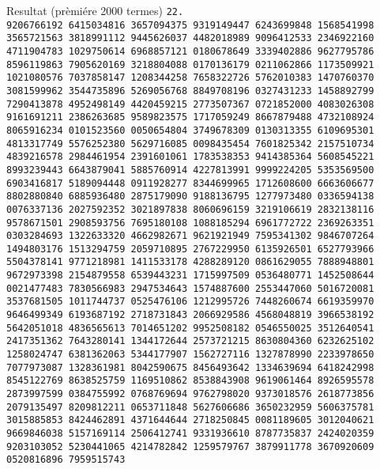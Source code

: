 \documentclass{beamer}
\begin{document}
\begin{frame}{Resultat (pr\`emi\'ere 2000 termes)}
\noindent\tiny{\texttt{22.\\
9206766192 6415034816 3657094375 9319149447 6243699848 1568541998 3565721563
3818991112 9445626037 4482018989 9096412533 2346922160 4711904783 1029750614
6968857121 0180678649 3339402886 9627795786 8596119863 7905620169 3218804088
0170136179 0211062866 1173509921 1021080576 7037858147 1208344258 7658322726
5762010383 1470760370 3081599962 3544735896 5269056768 8849708196 0327431233
1458892799 7290413878 4952498149 4420459215 2773507367 0721852000 4083026308
9161691211 2386263685 9589823575 1717059249 8667879488 4732108924 8065916234
0101523560 0050654804 3749678309 0130313355 6109695301 4813317749 5576252380
5629716085 0098435454 7601825342 2157510734 4839216578 2984461954 2391601061
1783538353 9414385364 5608545221 8993239443 6643879041 5885760914 4227813991
9999224205 5353569500 6903416817 5189094448 0911928277 8344699965 1712608600
6663606677 8802880840 6885936480 2875179090 9188136795 1277973480 0336594138
0076337136 2027592352 3021897838 8060696159 3219106619 2832138116 9578671501
2908593756 7695180108 1088185294 6961772722 2369263351 0303284693 1322633320
4662982671 9621921949 7595341302 9846707264 1494803176 1513294759 2059710895
2767229950 6135926501 6527793966 5504378141 9771218981 1411533178 4288289120
0861629055 7888948801 9672973398 2154879558 6539443231 1715997509 0536480771
1452508644 0021477483 7830566983 2947534643 1574887600 2553447060 5016720081
3537681505 1011744737 0525476106 1212995726 7448260674 6619359970 9646499349
6193687192 2718731843 2066929586 4568048819 3966538192 5642051018 4836565613
7014651202 9952508182 0546550025 3512640541 2417351362 7643280141 1344172644
2573721215 8630804360 6232625102 1258024747 6381362063 5344177907 1562727116
1327878990 2233978650 7077973087 1328361981 8042590675 8456493642 1334639694
6418242998 8545122769 8638525759 1169510862 8538843908 9619061464 8926595578
2873997599 0384755992 0768769694 9762798020 9373018576 2618773856 2079135497
8209812211 0653711848 5627606686 3650232959 5606375781 3015885853 8424462891
4371644644 2718250845 0081189605 3012040621 9669846038 5157169114 2506412741
9331936610 8787735837 2424020359 9203103052 5230441065 4214782842 1259579767
3879911778 3670920609 0520816896 7959515743 
}}
\end{frame}
\end{document}
